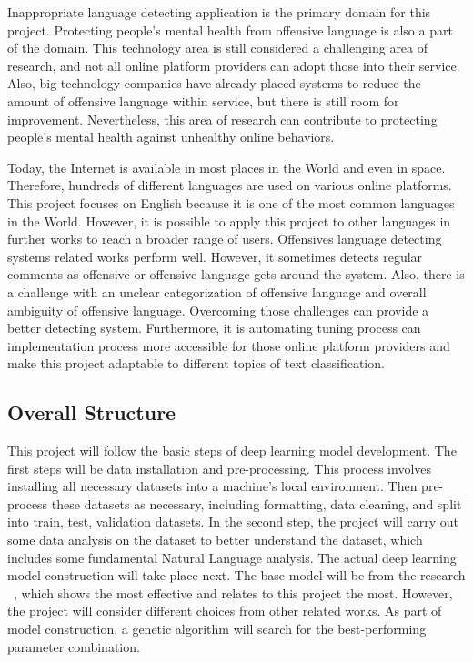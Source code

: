 \documentclass[11pt, natbib=false]{article}
\begin{document}
Inappropriate language detecting application is the primary domain for this project.
Protecting people’s mental health from offensive language is also a part of the domain.
This technology area is still considered a challenging area of research, and not all online platform providers can adopt those into their service.
Also, big technology companies have already placed systems to reduce the amount of offensive language within service, but there is still room for improvement.
Nevertheless, this area of research can contribute to protecting people’s mental health against unhealthy online behaviors. 

Today, the Internet is available in most places in the World and even in space.
Therefore, hundreds of different languages are used on various online platforms.
This project focuses on English because it is one of the most common languages in the World.
However, it is possible to apply this project to other languages in further works to reach a broader range of users.
Offensives language detecting systems related works perform well.
However, it sometimes detects regular comments as offensive or offensive language gets around the system.
Also, there is a challenge with an unclear categorization of offensive language and overall ambiguity of offensive language.
Overcoming those challenges can provide a better detecting system.
Furthermore, it is automating tuning process can implementation process more accessible for those online platform providers and make this project adaptable to different topics of text classification. 

\subsection{Overall Structure}
This project will follow the basic steps of deep learning model development.
The first steps will be data installation and pre-processing.
This process involves installing all necessary datasets into a machine’s local environment.
Then pre-process these datasets as necessary, including formatting, data cleaning, and split into train, test, validation datasets.
In the second step, the project will carry out some data analysis on the dataset to better understand the dataset, which includes some fundamental Natural Language analysis.
The actual deep learning model construction will take place next.
The base model will be from the research ~\cite{hada2021ruddit}, which shows the most effective and relates to this project the most.
However, the project will consider different choices from other related works.
As part of model construction, a genetic algorithm will search for the best-performing parameter combination. 
\end{document}
